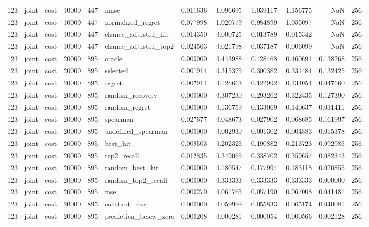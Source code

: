 \begin{tabular}{rllrrlrrrrrr}
123 & joint & cost & 10000 & 447 & nmse & 0.011636 & 1.096695 & 1.039117 & 1.156775 & NaN & 256 \\
123 & joint & cost & 10000 & 447 & normalized_regret & 0.077998 & 1.020779 & 0.984899 & 1.055097 & NaN & 256 \\
123 & joint & cost & 10000 & 447 & chance_adjusted_hit & 0.014350 & 0.000725 & -0.013789 & 0.015342 & NaN & 256 \\
123 & joint & cost & 10000 & 447 & chance_adjusted_top2 & 0.024563 & -0.021798 & -0.037187 & -0.006099 & NaN & 256 \\
123 & joint & cost & 20000 & 895 & oracle & 0.000000 & 0.443988 & 0.428468 & 0.460691 & 0.138268 & 256 \\
123 & joint & cost & 20000 & 895 & selected & 0.007914 & 0.315325 & 0.300382 & 0.331484 & 0.132425 & 256 \\
123 & joint & cost & 20000 & 895 & regret & 0.007914 & 0.128663 & 0.122992 & 0.134054 & 0.047660 & 256 \\
123 & joint & cost & 20000 & 895 & random_recovery & 0.000000 & 0.307230 & 0.293262 & 0.322435 & 0.127390 & 256 \\
123 & joint & cost & 20000 & 895 & random_regret & 0.000000 & 0.136759 & 0.133069 & 0.140637 & 0.031411 & 256 \\
123 & joint & cost & 20000 & 895 & spearman & 0.027677 & 0.048673 & 0.027902 & 0.068685 & 0.161997 & 256 \\
123 & joint & cost & 20000 & 895 & undefined_spearman & 0.000000 & 0.002930 & 0.001302 & 0.004883 & 0.015378 & 256 \\
123 & joint & cost & 20000 & 895 & best_hit & 0.009503 & 0.202325 & 0.190882 & 0.213723 & 0.092985 & 256 \\
123 & joint & cost & 20000 & 895 & top2_recall & 0.012835 & 0.349066 & 0.338702 & 0.359657 & 0.082343 & 256 \\
123 & joint & cost & 20000 & 895 & random_best_hit & 0.000000 & 0.180547 & 0.177994 & 0.183118 & 0.020855 & 256 \\
123 & joint & cost & 20000 & 895 & random_top2_recall & 0.000000 & 0.333333 & 0.333333 & 0.333333 & 0.000000 & 256 \\
123 & joint & cost & 20000 & 895 & mse & 0.000270 & 0.061765 & 0.057190 & 0.067008 & 0.041481 & 256 \\
123 & joint & cost & 20000 & 895 & constant_mse & 0.000000 & 0.059999 & 0.055833 & 0.065174 & 0.040081 & 256 \\
123 & joint & cost & 20000 & 895 & prediction_below_zero & 0.000208 & 0.000281 & 0.000054 & 0.000566 & 0.002128 & 256 \\

\end{tabular}
